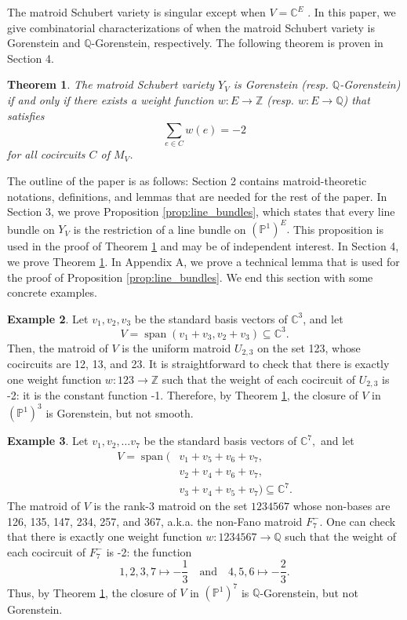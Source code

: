 \documentclass{amsart}
\theoremstyle{plain}
\newtheorem{theorem}{Theorem}[section]
\theoremstyle{definition}
\newtheorem{example}[theorem]{Example}
\newcommand{\Span}{\operatorname{span}}
\begin{document}
The matroid Schubert variety is singular except when $V = \mathbb{C}^E$  \cite[Corollary 3.9]{singular_thesis}. In this paper, we give combinatorial characterizations of when the matroid Schubert variety is Gorenstein and $\mathbb{Q}$-Gorenstein, respectively. The following theorem is proven in Section 4.

\begin{theorem}
\label{thm:gorenstein_condition}
    The matroid Schubert variety $Y_V$ is Gorenstein (resp. $\mathbb{Q}$-Gorenstein) if and only if there exists
    a weight function $w:E\to \mathbb{Z}$ (resp. $w:E\to \mathbb{Q}$) that satisfies
    \[\sum_{e \in C} w(e) = -2\]
    for all cocircuits $C$ of $M_V$.
\end{theorem}

The outline of the paper is as follows: Section 2 contains matroid-theoretic notations, definitions, and lemmas that are needed for the rest of the paper. In Section 3, we prove Proposition \ref{prop:line_bundles}, which states that every line bundle on $Y_V$ is the restriction of a line bundle on $(\mathbb{P}^1)^E.$ This proposition is used in the proof of Theorem \ref{thm:gorenstein_condition} and may be of independent interest. In Section 4, we prove Theorem \ref{thm:gorenstein_condition}. In Appendix A, we prove a technical lemma that is used for the proof of Proposition \ref{prop:line_bundles}. We end this section with some concrete examples.

\begin{example}
Let $v_1,v_2,v_3$ be the standard basis vectors of $\mathbb{C}^3$, and let 
\[V = \Span(v_1 + v_3, v_2+v_3) \subseteq \mathbb{C}^3.\]
Then, the matroid of $V$ is the uniform matroid $U_{2,3}$ on the set 123, whose cocircuits are 12, 13, and 23. It is straightforward to check that there is exactly one weight function $w: 123 \to \mathbb{Z}$ such that the weight of each cocircuit of $U_{2,3}$ is -2: it is the constant function -1. Therefore, by Theorem \ref{thm:gorenstein_condition}, the closure of $V$ in $(\mathbb{P}^1)^3$ is Gorenstein, but not smooth.
\end{example}

\begin{example}
\label{cool_example}
Let $v_1,v_2,\dots v_7$ be the standard basis vectors of $\mathbb{C}^7,$ and let 
\begin{equation*}
\begin{split}
V = \Span(& v_1+v_5+v_6+v_7, \\ & v_2+v_4+v_6+v_7, \\ & v_3 + v_4 + v_5 + v_7) \subseteq \mathbb{C}^7.
\end{split}    
\end{equation*}
The matroid of $V$ is the rank-3 matroid on the set $1234567$ whose non-bases are 126, 135, 147, 234, 257, and 367, a.k.a. the non-Fano matroid $F_7^-$. One can check that there is exactly one weight function $w: 1234567 \to \mathbb{Q}$ such that the weight of each cocircuit of $F^-_7$ is -2: the function
\[1,2,3,7 \mapsto -\frac{1}{3} \quad \text{and} \quad 4,5,6 \mapsto -\frac{2}{3}.\]
Thus, by Theorem \ref{thm:gorenstein_condition}, the closure of $V$ in $(\mathbb{P}^1)^7$ is $\mathbb{Q}$-Gorenstein, but not Gorenstein.
\end{example}
\end{document}

